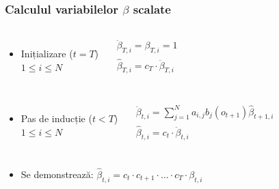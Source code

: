 \begin{frame}
  \frametitle{Calculul variabilelor $\beta$ scalate}
  \begin{columns}%
    \begin{itemize}
    \item Inițializare ($t = T$)\\\vspace*{1em}$1 \le i \le N$
    \end{itemize}%
    \begin{align}%
      \ddot{\beta}_{T,i} = \beta_{T,i} = 1\\
      \hat{\beta}_{T,i} = c_T \cdot \ddot{\beta}_{T,i}
    \end{align}%
  \end{columns}%
  \vspace*{.5em} \pause \horiline
  \begin{columns}
    \begin{itemize}
    \item Pas de inducție ($t < T$)\\\vspace*{1em}$1 \le i \le N$
    \end{itemize}%
    \begin{align}%
      \ddot{\beta}_{t,i} = \displaystyle\sum_{j=1}^{N}a_{i,j}b_{j}(o_{t+1})\hat{\beta}_{t+1,i}\\
      \hat{\beta}_{t,i} = c_{t} \cdot \ddot{\beta}_{t,i}
    \end{align}%
  \end{columns}%
  \begin{itemize}
  \item Se demonstrează: $\hat{\beta}_{t,i}=c_t \cdot c_{t+1} \cdot \ldots \cdot c_T \cdot \beta_{t,i}$
  \end{itemize}
\end{frame}

